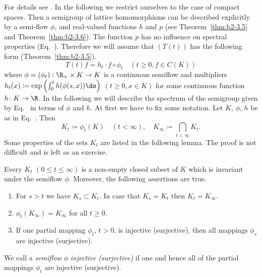 For details see \textcite{derndingernagel:1979}. 
In the following we restrict ourselves to the case of compact spaces. 
Then a semigroup of lattice homomorphisms can be described explicitly by a semi-flow $\phi$, and real-valued functions $h$ and $p$ (see Theorem~\ref{thm:b2-3.5} and Theorem~\ref{thm:b2-3.6}). 
The function $p$ has no influence on spectral properties (\cf Eq.~). 
Therefore we will assume that $(T(t))$ has the following form (\cf Theorem~\ref{thm:b2-3.5}). 
\begin{equation}\label{eq:b3-4.1}
	T(t)f = h_{t}\cdot f\circ\phi_{t} \quad (t \geq 0, f \in C(K)) 
\end{equation}
where $\phi = (\phi_{t}): \R_{+} \times K \to K$ is a continuous semiflow and multipliers $h_{t}(x) \coloneq \exp\left(\int_{0}^{t} h(\phi(s,x)) \ds\right)$ $(t \geq 0, x \in K)$ for some continuous function $h \colon K \to \R$.
In the following we will describe the spectrum of the semigroup given by Eq.~ in terms of\/ $\phi$ and $h$.
At first we have to fix some notation.
Let $K$, $\phi$, $h$ be as in Eq.~. 
Then
\begin{equation}\label{eq:b3-4.2}
K_{t} \coloneq \phi_{t}(K) \quad (t < \infty), \quad K_{\infty} \coloneq \bigcap_{t < \infty} K_{t}.
\end{equation}
Some properties of the sets $K_t$  are listed in the following lemma.
The proof is not difficult and is left as an exercise. 
\begin{lemma}\label{lem:b3-4.2}%
Every $K_{t}$ $(0 \leq t \leq \infty)$ is a non-empty closed subset of\/ $K$ which is invariant under the semiflow $\phi$.
	Moreover, the following assertions are true.
	\begin{enumerate}[\upshape (i)]
		\item 
		For $s > t$ we have $K_{s} \subset K_{t}$.
		In case that $K_{s} = K_{t}$ then $K_{t} = K_{\infty}$.
		
		\item
		$\phi_{t}(K_{\infty}) = K_{\infty}$ for all $t \geq 0$.
		
		\item 
		If one partial mapping $\phi_{t}$, $t > 0$, is injective (surjective), then all mappings $\phi_{s}$ are injective (surjective).
	\end{enumerate}
\end{lemma}
We call a \emph{semiflow} $\phi$ \emph{injective (surjective)} if one and hence all of the partial mappings $\phi_{t}$ are injective (surjective).
